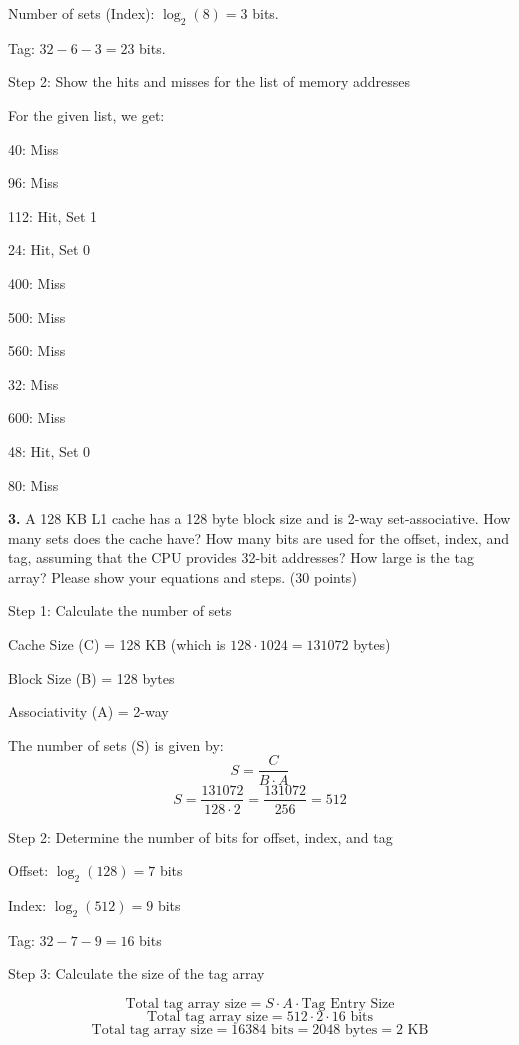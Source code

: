 \documentclass{article}
\begin{document}
Number of sets (Index): $\log_2(8) = 3$ bits.

Tag: $32 - 6 - 3 = 23$ bits.

Step 2: Show the hits and misses for the list of memory addresses

For the given list, we get:

40: Miss

96: Miss

112: Hit, Set 1

24: Hit, Set 0

400: Miss

500: Miss

560: Miss

32: Miss

600: Miss

48: Hit, Set 0

80: Miss

\newpage

\textbf{3.} A 128 KB L1 cache has a 128 byte block size and is
2-way set-associative. How many sets does the cache have? How
many bits are used for the offset, index, and tag, assuming
that the CPU provides 32-bit addresses? How large is the tag
array? Please show your equations and steps. (30 points)

Step 1: Calculate the number of sets

Cache Size (C) = 128 KB (which is $128 \cdot 1024 = 131072$ bytes)

Block Size (B) = 128 bytes

Associativity (A) = 2-way

The number of sets (S) is given by:
\[S = \frac{C}{B \cdot A}\]
\[S = \frac{131072}{128 \cdot 2} = \frac{131072}{256} = 512\]

Step 2: Determine the number of bits for offset, index, and tag

Offset: $\log_2(128) = 7$ bits

Index: $\log_2(512) = 9$ bits

Tag: $32 - 7 - 9 = 16$ bits

Step 3: Calculate the size of the tag array

\[\text{Total tag array size} = S \cdot A \cdot \text{Tag Entry Size}\]
\[\text{Total tag array size} = 512 \cdot 2 \cdot 16 \text{ bits}\]
\[\text{Total tag array size} = 16384 \text{ bits} = 2048 \text{ bytes} =  2 \text{ KB}\]
\end{document}
